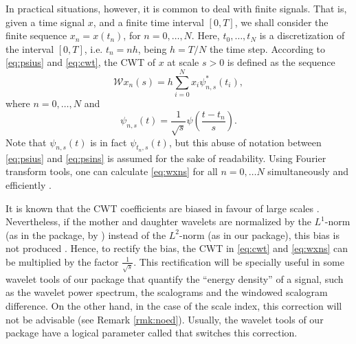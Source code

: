 In practical situations, however, it is common to deal with finite signals. That is, given a time signal $x$, and a finite time interval $[0,T]$, we shall consider the finite sequence $x_n=x\left(t_n\right)$, for $n=0,\ldots,N$. Here, $t_0,\ldots,t_{N}$ is a discretization of the interval $[0,T]$, i.e. $t_n = nh$, being $h = T/N$ the time step.  According to \eqref{eq:psius} and \eqref{eq:cwt}, the CWT of $x$ at scale $s>0$ is defined as the sequence
\begin{equation}
\label{eq:wxns}
\mathcal{W}x_n(s)=h\sum _{i=0}^{N} x_i \psi _{n,s}^*\left( t_i\right) ,
\end{equation}
where $n=0,\ldots,N$ and
\begin{equation}
\label{eq:psins}
\psi_{n,s}(t)=\frac{1}{\sqrt{s}}\psi \left( \frac{t-t_n}{s}\right) .
\end{equation}
Note that $\psi_{n,s}(t)$ is in fact $\psi_{t_n,s}(t)$, but this abuse of notation between \eqref{eq:psius} and \eqref{eq:psins} is assumed for the sake of readability. Using Fourier transform tools, one can calculate \eqref{eq:wxns} for all $n=0,\ldots N$ simultaneously and efficiently \citep{tor98}.

\begin{rmk}
\label{rmk:cwt}
It is known that the CWT coefficients are biased in favour of large scales \citep{liu07}. Nevertheless, if the mother and daughter wavelets are normalized by the $L^1$-norm (as in the  package, by \citet{Rwave}) instead of the $L^2$-norm (as in our package), this bias is not produced . Hence, to rectify the bias, the CWT in \eqref{eq:cwt} and \eqref{eq:wxns} can be multiplied by the factor $\frac{1}{\sqrt{s}}$. This rectification will be specially useful in some wavelet tools of our package that quantify the ``energy density'' of a signal, such as the wavelet power spectrum, the scalograms and the windowed scalogram difference. On the other hand, in the case of the scale index, this correction will not be advisable (see Remark \ref{rmk:noed}). Usually, the wavelet tools of our package have a logical parameter called  that switches this correction.
\end{rmk}

